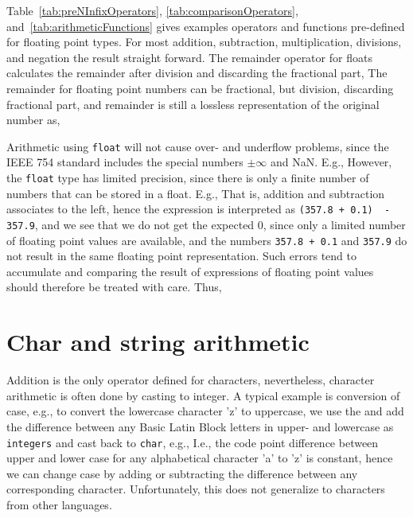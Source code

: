 Table~\ref{tab:preNInfixOperators}, \ref{tab:comparisonOperators}, and~\ref{tab:arithmeticFunctions} gives examples operators and functions pre-defined for floating point types. For most addition, subtraction, multiplication, divisions, and negation the result straight forward. The remainder operator for floats calculates the remainder after division and discarding the fractional part,
%
%
The remainder for floating point numbers can be fractional, but division, discarding fractional part, and remainder is still a lossless representation of the original number as,
%
%

Arithmetic using \lstinline|float| will not cause over- and underflow problems, since the IEEE 754 standard includes the special numbers $\pm\infty$ and NaN. E.g.,
%
%
However, the \lstinline|float| type has limited precision, since there is only a finite number of numbers that can be stored in a float. E.g.,
%
%
That is, addition and subtraction associates to the left, hence the expression is interpreted as \lstinline!(357.8 + 0.1)  - 357.9!, and we see that we do not get the expected 0, since only a limited number of floating point values are available, and the numbers \lstinline!357.8 + 0.1!  and \lstinline!357.9! do not result in the same floating point representation. Such errors tend to accumulate and comparing the result of expressions of floating point values should therefore be treated with care. Thus, 

\section{Char and string arithmetic}
Addition is the only operator defined for characters, nevertheless, character arithmetic is often done by casting to integer. A typical example is conversion of case, e.g., to convert the lowercase character 'z' to uppercase, we use the  and add the difference between any Basic Latin Block letters in upper- and lowercase as \lstinline{integers} and cast back to \lstinline{char}, e.g.,
%
%
I.e., the code point difference between upper and lower case for any alphabetical character 'a' to 'z' is constant, hence we can change case by adding or subtracting the difference between any corresponding character. Unfortunately, this does not generalize to characters from other languages.

